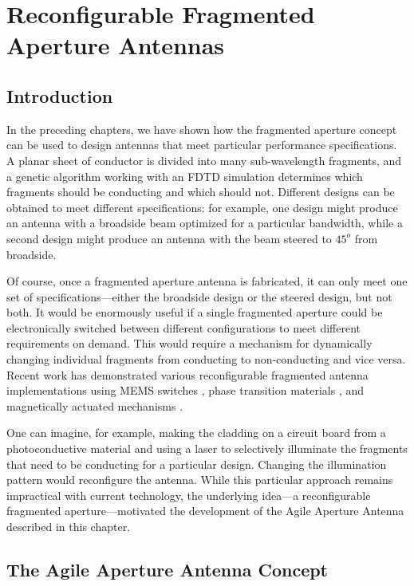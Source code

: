\chapter{Reconfigurable Fragmented Aperture Antennas}

\section{Introduction}

In the preceding chapters, we have shown how the fragmented aperture concept can be used to design antennas that meet particular performance specifications.  A planar sheet of conductor is divided into many sub-wavelength fragments, and a genetic algorithm working with an FDTD simulation determines which fragments should be conducting and which should not.  Different designs can be obtained to meet different specifications: for example, one design might produce an antenna with a broadside beam optimized for a particular bandwidth, while a second design might produce an antenna with the beam steered to $45^o$ from broadside.

Of course, once a fragmented aperture antenna is fabricated, it can only meet one set of specifications---either the broadside design or the steered design, but not both.  It would be enormously useful if a single fragmented aperture could be electronically switched between different configurations to meet different requirements on demand.  This would require a mechanism for dynamically changing individual fragments from conducting to non-conducting and vice versa.  Recent work has demonstrated various reconfigurable fragmented antenna implementations using MEMS switches \cite{Wright2018Mems,Ali2014Mems}, phase transition materials \cite{Lou2025Frequency}, and magnetically actuated mechanisms \cite{Pal2018Magnetically}.

One can imagine, for example, making the cladding on a circuit board from a photoconductive material and using a laser to selectively illuminate the fragments that need to be conducting for a particular design.  Changing the illumination pattern would reconfigure the antenna.  While this particular approach remains impractical with current technology, the underlying idea---a reconfigurable fragmented aperture---motivated the development of the Agile Aperture Antenna described in this chapter.

\section{The Agile Aperture Antenna Concept}

